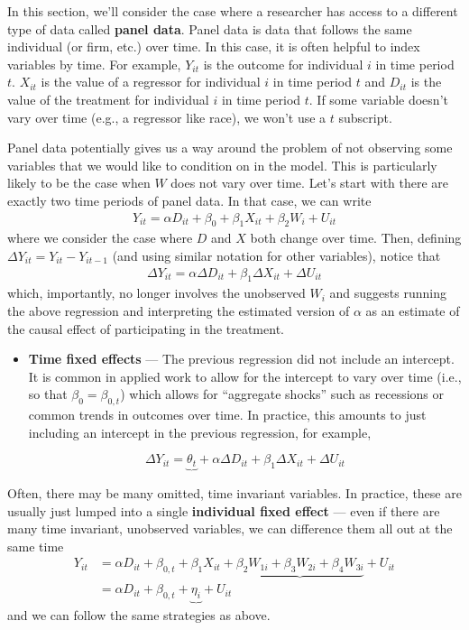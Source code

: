 \documentclass[
  letterpaper,
  DIV=11,
  numbers=noendperiod]{scrreprt}
\begin{document}
In this section, we'll consider the case where a researcher has access
to a different type of data called \textbf{panel data}. Panel data is
data that follows the same individual (or firm, etc.) over time. In this
case, it is often helpful to index variables by time. For example,
\(Y_{it}\) is the outcome for individual \(i\) in time period \(t\).
\(X_{it}\) is the value of a regressor for individual \(i\) in time
period \(t\) and \(D_{it}\) is the value of the treatment for individual
\(i\) in time period \(t\). If some variable doesn't vary over time
(e.g., a regressor like race), we won't use a \(t\) subscript.

Panel data potentially gives us a way around the problem of not
observing some variables that we would like to condition on in the
model. This is particularly likely to be the case when \(W\) does not
vary over time. Let's start with there are exactly two time periods of
panel data. In that case, we can write \begin{align*}
  Y_{it} = \alpha D_{it} + \beta_0 + \beta_1 X_{it} + \beta_2 W_i + U_{it}
\end{align*} where we consider the case where \(D\) and \(X\) both
change over time. Then, defining \(\Delta Y_{it} = Y_{it} - Y_{it-1}\)
(and using similar notation for other variables), notice that
\begin{align*}
  \Delta Y_{it} = \alpha \Delta D_{it} + \beta_1 \Delta X_{it} + \Delta U_{it}
\end{align*} which, importantly, no longer involves the unobserved
\(W_i\) and suggests running the above regression and interpreting the
estimated version of \(\alpha\) as an estimate of the causal effect of
participating in the treatment.

\begin{itemize}
\item
  \textbf{Time fixed effects} --- The previous regression did not
  include an intercept. It is common in applied work to allow for the
  intercept to vary over time (i.e., so that \(\beta_0 = \beta_{0,t}\))
  which allows for ``aggregate shocks'' such as recessions or common
  trends in outcomes over time. In practice, this amounts to just
  including an intercept in the previous regression, for example,

  \[
      \Delta Y_{it} = \underbrace{\theta_t} + \alpha \Delta D_{it} + \beta_1 \Delta X_{it} + \Delta U_{it} 
    \]
\end{itemize}

Often, there may be many omitted, time invariant variables. In practice,
these are usually just lumped into a single \textbf{individual fixed
effect} --- even if there are many time invariant, unobserved variables,
we can difference them all out at the same time \begin{align*}
  Y_{it} &= \alpha D_{it} + \beta_{0,t} + \beta_1 X_{it} + \underbrace{\beta_2 W_{1i} + \beta_3 W_{2i} + \beta_4 W_{3i}} + U_{it} \\
  &= \alpha D_{it} + \beta_{0,t} + \underbrace{\eta_i} + U_{it} 
\end{align*} and we can follow the same strategies as above.
\end{document}
